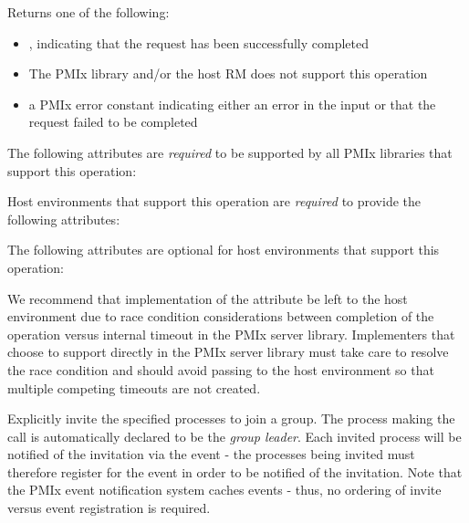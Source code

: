 Returns one of the following:

\begin{itemize}
    \item {}, indicating that the request has been successfully completed
    \item {} The \ac{PMIx} library and/or the host \ac{RM} does not support this operation
    \item a \ac{PMIx} error constant indicating either an error in the input or that the request failed to be completed
\end{itemize}

\reqattrstart
The following attributes are \textit{required} to be supported by all \ac{PMIx} libraries that support this operation:


Host environments that support this operation are \textit{required} to provide the following attributes:

\reqattrend

\optattrstart
The following attributes are optional for host environments that support this operation:


\optattrend

\adviceimplstart
We recommend that implementation of the  attribute be left to the host environment due to race condition considerations between completion of the operation versus internal timeout in the \ac{PMIx} server library. Implementers that choose to support  directly in the \ac{PMIx} server library must take care to resolve the race condition and should avoid passing  to the host environment so that multiple competing timeouts are not created.
\adviceimplend


\descr

Explicitly invite the specified processes to join a group. The process making the  call is automatically declared to be the \emph{group leader}. Each invited process will be notified of the invitation via the  event - the processes being invited must therefore register for the  event in order to be notified of the invitation. Note that the \ac{PMIx} event notification system caches events - thus, no ordering of invite versus event registration is required.

